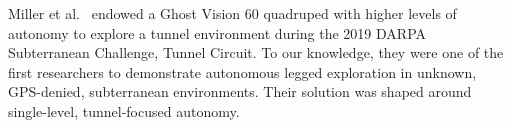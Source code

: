\documentclass[letterpaper, 10pt, conference]{ieeeconf}      %
\newcommand{\ph}[1]{{\textbf{#1}:}} %
\newcommand{\todo}[1]{{\color{red} #1 }} %
\newcommand{\inst}[1]{{\color{orange} #1 }} %
\newcommand{\rev}[1]{{\color{blue}#1}} %
\begin{document}
Miller et al.~\cite{miller2019tunnel} 
endowed a Ghost Vision 60 quadruped with higher levels of autonomy to explore a tunnel environment during the 2019 DARPA Subterranean Challenge, Tunnel Circuit. To our knowledge, they were one of the first researchers to demonstrate  
autonomous legged exploration in unknown, GPS-denied, subterranean environments. Their solution was %
\rev{shaped around} single-level, tunnel-focused autonomy. %


\end{document}
